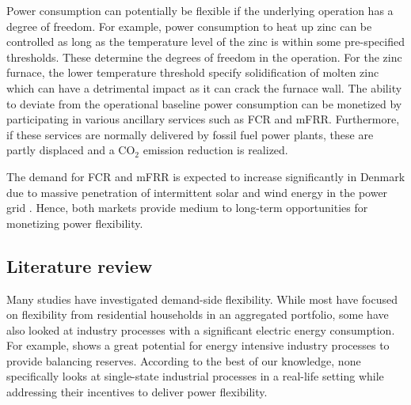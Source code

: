 \documentclass[sigconf]{acmart}
\begin{document}


Power consumption can potentially be flexible if the underlying operation has a  degree of freedom. For example, power consumption to heat up zinc can be controlled as long as the temperature level of the zinc is within some pre-specified thresholds. These determine the degrees of freedom in the operation. For the zinc furnace, the lower temperature threshold specify solidification of molten zinc which can have a detrimental impact as it can crack the furnace wall.
%
The ability to deviate from the operational baseline power consumption can be monetized by participating in various ancillary services such as FCR and mFRR. Furthermore, if these services are normally delivered by fossil fuel power plants, these are partly displaced and a CO$_{2}$ emission reduction is realized.

The demand for FCR and mFRR is expected to increase significantly in Denmark due to massive penetration of intermittent solar and wind energy in the power grid \cite{energinet:scenario_report_2022}. Hence, both markets provide medium to long-term opportunities for monetizing power flexibility.


\subsection{Literature review}

Many studies have investigated demand-side flexibility. While most have focused on flexibility from residential households in an aggregated portfolio, some have also looked at industry processes with a significant electric energy consumption. For example, \cite{paulus2011potential} shows a great potential for energy intensive industry processes to provide balancing reserves. According to the best of our knowledge, none specifically looks at single-state industrial processes in a real-life setting while addressing their incentives to deliver power flexibility.
\end{document}
